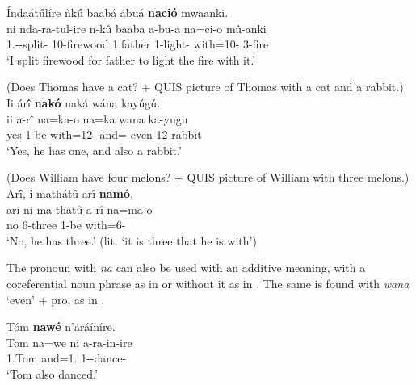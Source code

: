 \documentclass[output=paper]{langscibook}
\begin{document}
\ea
\label{bkm:Ref105385725}
\label{bkm:Ref94509818}Índaát\'{û}líre ǹk\'{û} baabá ábuá \textbf{nació} mwaanki.\\
\gll
ni  nda-ra-tul-ire  n-kû  baaba  a-bu-a  na=ci-o  mû-anki \\
\FOC{} 1\SG.\SM-\YPST{}-split-\PFV{} 10-firewood  1.father  1\SM{}-light-\FV{} with=10-\PRO{} 3-fire \\
\glt
‘I split firewood for father to light the fire with it.’

\z

\ea
(Does Thomas have a cat? + QUIS picture of Thomas with a cat and a rabbit.)\\
Ii ár\'{î} \textbf{nakó} naká wána kayúg\'{u}.\\
\gll
ii  a-rî  na=ka-o  na=ka  wana  ka-yugu\\
yes  1\SM{}-be  with=12-\PRO{} and=\POL{} even  12-rabbit\\
\glt
‘Yes, he has one, and also a rabbit.’

\z

\ea
\label{bkm:Ref105385863}\label{bkm:Ref94509878}
(Does William have four melons? + QUIS picture of William with three melons.)\\
Ar\'{î}, i mathátû arî \textbf{namó}.\\
\gll
ari  ni  ma-thatû  a-rî  na=ma-o\\
no \FOC{} 6-three  1\SM{}-be  with=6-\PRO{}\\
\glt
‘No, he has three.’ (lit. ‘it is three that he is with’)

\z

The pronoun with \textit{na} can also be used with an additive meaning, with a coreferential noun phrase as in  or without it as in . The same is found with \textit{wana} ‘even’ + pro, as in .

\ea
\label{bkm:Ref94510139}
Tóm \textbf{nawé} n’áráíníre.\\
\gll
Tom  na=we  ni  a-ra-in-ire\\
1.Tom  and=1.\PRO{} \FOC{} 1\SM{}-\YPST{}-dance-\PFV{}\\
\glt
‘Tom also danced.’
\end{document}
